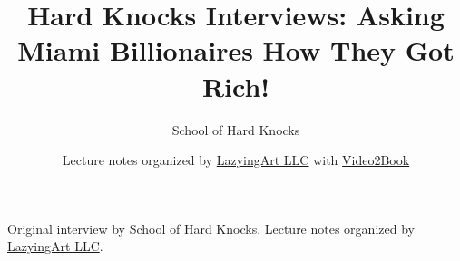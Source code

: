 \documentclass[11pt,oneside]{book}
\begin{document}
\frontmatter
\title{Hard Knocks Interviews: Asking Miami Billionaires How They Got Rich!}
\author{School of Hard Knocks}
\date{Lecture notes organized by \href{https://lazying.art}{LazyingArt LLC} with \href{https://github.com/lachlanchen/Video2Book}{Video2Book}}
\maketitle
\begin{center}
\small Original interview by School of Hard Knocks. Lecture notes organized by \href{https://lazying.art}{LazyingArt LLC}.
\end{center}
\clearpage
\mainmatter

\end{document}
